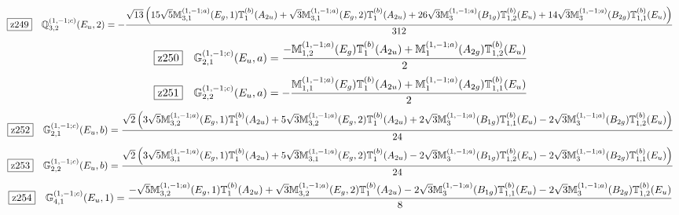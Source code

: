 \documentclass[fleqn,10pt,landscape]{jsarticle}
\begin{document}
\begin{dmath*}
\hspace*{3mm}\fbox{z249}\quad \mathbb{Q}_{3,2}^{(1,-1;c)}(E_{u},2)=- \frac{\sqrt{13} \left(15 \sqrt{5} \mathbb{M}_{3,1}^{(1,-1;a)}(E_{g},1) \mathbb{T}_{1}^{(b)}(A_{2u}) + \sqrt{3} \mathbb{M}_{3,1}^{(1,-1;a)}(E_{g},2) \mathbb{T}_{1}^{(b)}(A_{2u}) + 26 \sqrt{3} \mathbb{M}_{3}^{(1,-1;a)}(B_{1g}) \mathbb{T}_{1,2}^{(b)}(E_{u}) + 14 \sqrt{3} \mathbb{M}_{3}^{(1,-1;a)}(B_{2g}) \mathbb{T}_{1,1}^{(b)}(E_{u})\right)}{312}
\end{dmath*}
\begin{dmath*}
\hspace*{3mm}\fbox{z250}\quad \mathbb{G}_{2,1}^{(1,-1;c)}(E_{u},a)=\frac{- \mathbb{M}_{1,2}^{(1,-1;a)}(E_{g}) \mathbb{T}_{1}^{(b)}(A_{2u}) + \mathbb{M}_{1}^{(1,-1;a)}(A_{2g}) \mathbb{T}_{1,2}^{(b)}(E_{u})}{2}
\end{dmath*}
\begin{dmath*}
\hspace*{3mm}\fbox{z251}\quad \mathbb{G}_{2,2}^{(1,-1;c)}(E_{u},a)=- \frac{\mathbb{M}_{1,1}^{(1,-1;a)}(E_{g}) \mathbb{T}_{1}^{(b)}(A_{2u}) + \mathbb{M}_{1}^{(1,-1;a)}(A_{2g}) \mathbb{T}_{1,1}^{(b)}(E_{u})}{2}
\end{dmath*}
\begin{dmath*}
\hspace*{3mm}\fbox{z252}\quad \mathbb{G}_{2,1}^{(1,-1;c)}(E_{u},b)=\frac{\sqrt{2} \left(3 \sqrt{5} \mathbb{M}_{3,2}^{(1,-1;a)}(E_{g},1) \mathbb{T}_{1}^{(b)}(A_{2u}) + 5 \sqrt{3} \mathbb{M}_{3,2}^{(1,-1;a)}(E_{g},2) \mathbb{T}_{1}^{(b)}(A_{2u}) + 2 \sqrt{3} \mathbb{M}_{3}^{(1,-1;a)}(B_{1g}) \mathbb{T}_{1,1}^{(b)}(E_{u}) - 2 \sqrt{3} \mathbb{M}_{3}^{(1,-1;a)}(B_{2g}) \mathbb{T}_{1,2}^{(b)}(E_{u})\right)}{24}
\end{dmath*}
\begin{dmath*}
\hspace*{3mm}\fbox{z253}\quad \mathbb{G}_{2,2}^{(1,-1;c)}(E_{u},b)=\frac{\sqrt{2} \left(3 \sqrt{5} \mathbb{M}_{3,1}^{(1,-1;a)}(E_{g},1) \mathbb{T}_{1}^{(b)}(A_{2u}) + 5 \sqrt{3} \mathbb{M}_{3,1}^{(1,-1;a)}(E_{g},2) \mathbb{T}_{1}^{(b)}(A_{2u}) - 2 \sqrt{3} \mathbb{M}_{3}^{(1,-1;a)}(B_{1g}) \mathbb{T}_{1,2}^{(b)}(E_{u}) - 2 \sqrt{3} \mathbb{M}_{3}^{(1,-1;a)}(B_{2g}) \mathbb{T}_{1,1}^{(b)}(E_{u})\right)}{24}
\end{dmath*}
\begin{dmath*}
\hspace*{3mm}\fbox{z254}\quad \mathbb{G}_{4,1}^{(1,-1;c)}(E_{u},1)=\frac{- \sqrt{5} \mathbb{M}_{3,2}^{(1,-1;a)}(E_{g},1) \mathbb{T}_{1}^{(b)}(A_{2u}) + \sqrt{3} \mathbb{M}_{3,2}^{(1,-1;a)}(E_{g},2) \mathbb{T}_{1}^{(b)}(A_{2u}) - 2 \sqrt{3} \mathbb{M}_{3}^{(1,-1;a)}(B_{1g}) \mathbb{T}_{1,1}^{(b)}(E_{u}) - 2 \sqrt{3} \mathbb{M}_{3}^{(1,-1;a)}(B_{2g}) \mathbb{T}_{1,2}^{(b)}(E_{u})}{8}
\end{dmath*}
\end{document}
